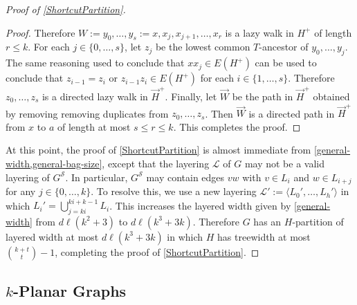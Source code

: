 \documentclass{patmorin}
\theoremstyle{plain}
\theoremstyle{definition}
\newcommand{\note}[2]{\noindent{\color{red}[#1:~#2]}}
\renewcommand{\SS}{\mathcal{S}}
\renewcommand{\le}{\leqslant}
\begin{document}
\begin{proof}[Proof of \cref{ShortcutPartition}]
\begin{proof}
  Therefore $W:=y_0,\ldots,y_s:=x,x_j,x_{j+1},\ldots,x_r$ is a lazy walk in $H^+$ of length $r\le k$.  For each $j\in \{0,\ldots,s\}$, let $z_j$ be the lowest common $T$-ancestor of $y_0,\ldots,y_j$.  The same reasoning used to conclude that $xx_j\in E(H^+)$ can be used to conclude that $z_{i-1}=z_i$ or $z_{i-1}z_i\in E(H^+)$ for each $i\in\{1,\ldots,s\}$.  Therefore $z_0,\ldots,z_s$ is a directed lazy walk in $\overrightarrow{H}^+$.  Finally, let $\overrightarrow{W}$ be the path in $\overrightarrow{H}^+$ obtained by removing removing duplicates from $z_0,\ldots,z_s$.  Then $\overrightarrow{W}$ is a directed path in $\overrightarrow{H}^+$ from $x$ to $a$ of length at most $s\le r\le k$.  This completes the proof.
\end{proof}

At this point, the proof of \cref{ShortcutPartition} is almost immediate from \cref{general-width,general-bag-size}, except that the layering $\mathcal{L}$ of $G$ may not be a valid layering of $G^{\SS}$.  In particular, $G^{\SS}$ may contain edges $vw$ with $v\in L_i$ and $w\in L_{i+j}$ for any $j\in\{0,\ldots,k\}$.  To resolve this, we use a new layering $\mathcal{L}':=\langle L_0',\ldots,L_h'\rangle$ in which $L_i'=\bigcup_{j=ki}^{ki+k-1} L_i$.  This increases the layered width given by \cref{general-width} from $d\ell(k^2+3)$ to $d\ell(k^3+3k)$.  Therefore $G$ has an $H$-partition of layered width at most $d\ell(k^3+3k)$ in which $H$ has treewidth at most $\binom{k+t}{t}-1$, completing the proof of \cref{ShortcutPartition}.
\end{proof}

\subsection{\boldmath $k$-Planar Graphs}

\end{document}
